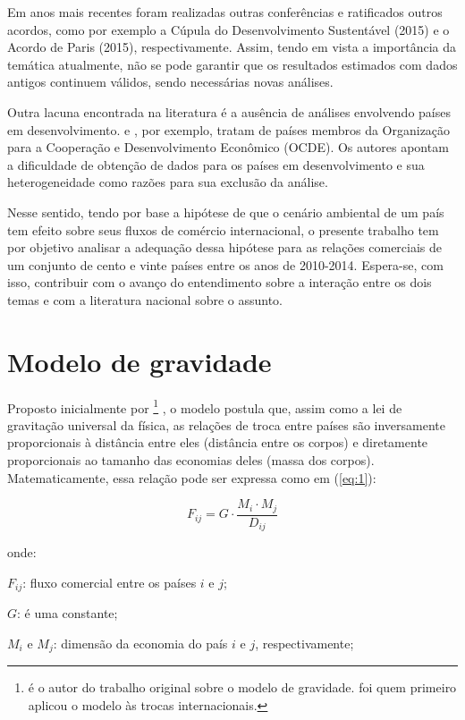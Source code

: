 \documentclass[12pt,
               openright,
               oneside,
               a4paper,
							 section=TITLE,     %
               subsection=Title,  %
               english,brazil]{article}
\begin{document}
Em anos mais recentes foram realizadas outras conferências e ratificados outros acordos, como por exemplo a Cúpula do Desenvolvimento Sustentável (2015) e o Acordo de Paris (2015), respectivamente. Assim, tendo em vista a importância da temática atualmente, não se pode garantir que os resultados estimados com dados antigos continuem válidos, sendo necessárias novas análises.

Outra lacuna encontrada na literatura é a ausência de análises envolvendo países em desenvolvimento.  e , por exemplo, tratam de países membros da Organização para a Cooperação e Desenvolvimento Econômico (OCDE). Os autores apontam a dificuldade de obtenção de dados para os países em desenvolvimento e sua heterogeneidade como razões para sua exclusão da análise.

Nesse sentido, tendo por base a hipótese de que o cenário ambiental de um país tem efeito sobre seus fluxos de comércio internacional, o presente trabalho tem por objetivo analisar a adequação dessa hipótese para as relações comerciais de um conjunto de cento e vinte países entre os anos de 2010-2014. Espera-se, com isso, contribuir com o avanço do entendimento sobre a interação entre os dois temas e com a literatura nacional sobre o assunto.

\section{Modelo de gravidade}
 Proposto inicialmente por  \footnote{ é o autor do trabalho original sobre o modelo de gravidade.  foi quem primeiro aplicou o modelo às trocas internacionais.} , o modelo postula que, assim como a lei de gravitação universal da física, as relações de troca entre países são inversamente proporcionais à distância entre eles (distância entre os corpos) e diretamente proporcionais ao tamanho das economias deles (massa dos corpos). Matematicamente, essa relação pode ser expressa como em (\ref{eq:1}):
 
 \begin{equation} \label{eq:1} F_{ij} = G \cdot \frac{M_i \cdot M_j}{D_{ij}} \end{equation}
 
onde:

 $F_{ij}$: fluxo comercial entre os países $i$ e $j$;
 
 $G$: é uma constante;
 
 $M_i$ e $M_j$: dimensão da economia do país $i$ e $j$, respectivamente;
 
\end{document}
